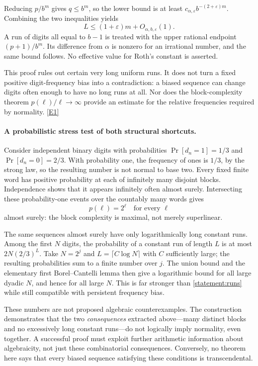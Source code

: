 \documentclass[11pt,a4paper]{article}
\newcommand{\eref}[2]{\hyperlink{extra:#1:#2}{[E#2]}}
\numberwithin{equation}{section}
\begin{document}
Reducing $p/b^m$ gives $q\leq b^m$, so the lower bound is at least
$c_{\alpha,\varepsilon}b^{-(2+\varepsilon)m}$.  Combining the two
inequalities yields
\begin{equation}\label{statement:runs}
 L\leq(1+\varepsilon)m+O_{\alpha,b,\varepsilon}(1).
\end{equation}
A run of digits all equal to $b-1$ is treated with the upper rational
endpoint $(p+1)/b^m$.  Its difference from $\alpha$ is nonzero for
an irrational number, and the same bound follows.  No effective value
for Roth's constant is asserted.

This proof rules out certain very long uniform runs.  It does not
turn a fixed positive digit-frequency bias into a contradiction:
a biased sequence can change digits often enough to have no long
runs at all.  Nor does the block-complexity theorem
$p(\ell)/\ell\to\infty$ provide an estimate for the relative
frequencies required by normality. \eref{statement}{1}

\paragraph{A probabilistic stress test of both structural shortcuts.}
Consider independent binary digits with probabilities
$\Pr[d_n=1]=1/3$ and $\Pr[d_n=0]=2/3$.  With probability one, the
frequency of ones is $1/3$, by the strong law, so the resulting number
is not normal to base two.  Every fixed finite word has positive
probability at each of infinitely many disjoint blocks.  Independence
shows that it appears infinitely often almost surely.  Intersecting
these probability-one events over the countably many words gives
\[
 p(\ell)=2^\ell\quad\text{for every }\ell
\]
almost surely: the block complexity is maximal, not merely superlinear.

The same sequences almost surely have only logarithmically long
constant runs.  Among the first $N$ digits, the probability of a
constant run of length $L$ is at most
$2N(2/3)^L$.  Take $N=2^j$ and $L=\lceil C\log N\rceil$ with
$C$ sufficiently large; the resulting probabilities sum to a finite
number over $j$.  The union bound and the elementary first
Borel--Cantelli lemma then give a logarithmic bound for all large
dyadic $N$, and hence for all large $N$.  This is far stronger than
\eqref{statement:runs} while still compatible with persistent frequency bias.

These numbers are not proposed algebraic counterexamples.  The
construction demonstrates that the two \emph{consequences} extracted
above---many distinct blocks and no excessively long constant
runs---do not logically imply normality, even together.  A successful
proof must exploit further arithmetic information about algebraicity,
not just these combinatorial consequences.  Conversely, no theorem
here says that every biased sequence satisfying these conditions is
transcendental.
\end{document}
